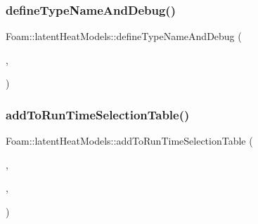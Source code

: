 \subsubsection{\texorpdfstring{define\+Type\+Name\+And\+Debug()}{defineTypeNameAndDebug()}\hspace{0.1cm}{\footnotesize\ttfamily [2/3]}}
{\footnotesize\ttfamily Foam\+::latent\+Heat\+Models\+::define\+Type\+Name\+And\+Debug (\begin{DoxyParamCaption}\item[{\hyperlink{classFoam_1_1latentHeatModels_1_1fromThermophysicalPropertiesLatentHeat}{from\+Thermophysical\+Properties\+Latent\+Heat}}]{,  }\item[{0}]{ }\end{DoxyParamCaption})}

\mbox{\label{namespaceFoam_1_1latentHeatModels_a65d0300798ac32623fcc1ad44f46eb08}} 
\subsubsection{\texorpdfstring{add\+To\+Run\+Time\+Selection\+Table()}{addToRunTimeSelectionTable()}\hspace{0.1cm}{\footnotesize\ttfamily [2/3]}}
{\footnotesize\ttfamily Foam\+::latent\+Heat\+Models\+::add\+To\+Run\+Time\+Selection\+Table (\begin{DoxyParamCaption}\item[{\hyperlink{classFoam_1_1latentHeatModel}{latent\+Heat\+Model}}]{,  }\item[{\hyperlink{classFoam_1_1latentHeatModels_1_1fromThermophysicalPropertiesLatentHeat}{from\+Thermophysical\+Properties\+Latent\+Heat}}]{,  }\item[{latent\+Heat\+Models}]{ }\end{DoxyParamCaption})}

\mbox{\label{namespaceFoam_1_1latentHeatModels_af72dbd61a38fe62a8dfc1baca12fa596}} 
